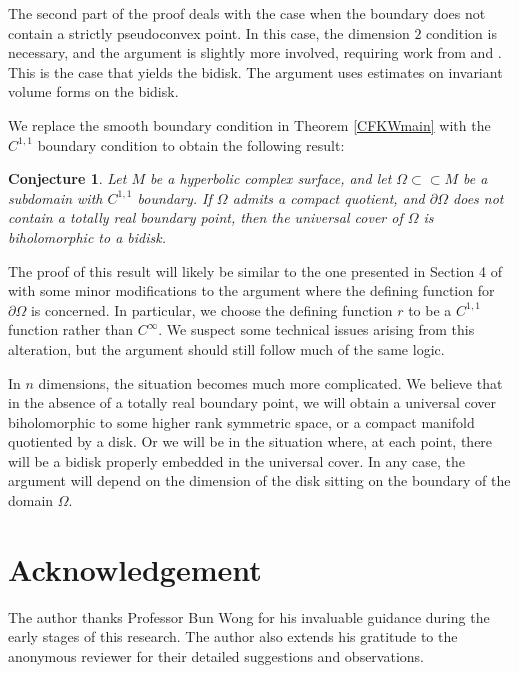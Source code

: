 \documentclass[12pt]{article}
\newtheorem{conjecture}[lemma]{Conjecture}
\begin{document}
The second part of the proof deals with the case when the boundary does not contain a strictly pseudoconvex point. In this case, the dimension $2$ condition is necessary, and the argument is slightly more involved, requiring work from \cite{FW1} and \cite{FW2}. This is the case that yields the bidisk. The argument uses estimates on invariant volume forms on the bidisk.

We replace the smooth boundary condition in Theorem \ref{CFKWmain} with the $C^{1,1}$ boundary condition to obtain the following result:

\begin{conjecture}
Let $M$ be a hyperbolic complex surface, and let $\Omega\subset\subset M$ be a subdomain with $C^{1,1}$ boundary. If $\Omega$ admits a compact quotient, and $\partial\Omega$ does not contain a totally real boundary point, then the universal cover of $\Omega$ is biholomorphic to a bidisk.
\end{conjecture}

The proof of this result will likely be similar to the one presented in Section 4 of \cite{CFKW} with some minor modifications to the argument where the defining function for $\partial\Omega$ is concerned. In particular, we choose the defining function $r$ to be a $C^{1,1}$ function rather than $C^{\infty}$. We suspect some technical issues arising from this alteration, but the argument should still follow much of the same logic.

In $n$ dimensions, the situation becomes much more complicated. We believe that in the absence of a totally real boundary point, we will obtain a universal cover biholomorphic to some higher rank symmetric space, or a compact manifold quotiented by a disk. Or we will be in the situation where, at each point, there will be a bidisk properly embedded in the universal cover. In any case, the argument will depend on the dimension of the disk sitting on the boundary of the domain $\Omega$.


\section*{Acknowledgement}
The author thanks Professor Bun Wong for his invaluable guidance during the early stages of this research. The author also extends his gratitude to the anonymous reviewer for their detailed suggestions and observations. 
\end{document}
